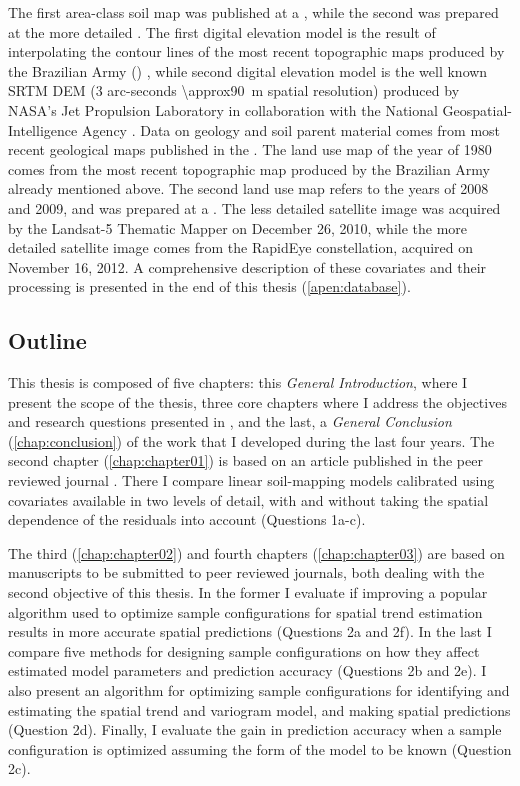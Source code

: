 The first area-class soil map was published at a  \cite{AzolinEtAl1988}, while the 
second was prepared at the more detailed  \cite{MiguelEtAl2012}. The first digital 
elevation model is the result of interpolating the contour lines of the most recent topographic maps
produced by the Brazilian Army () \cite{DSG1980,DSG1992,DSG1992a}, while second 
digital elevation model is the well known SRTM DEM (3 arc-seconds \SI{\approx90}{\metre} spatial 
resolution) produced by NASA’s Jet Propulsion Laboratory in collaboration with the National 
Geospatial-Intelligence Agency \cite{RodriguezEtAl2006}. Data on geology and soil parent material 
comes from most recent geological maps published in the  
\cite{MacielFilho1990,GasparettoEtAl1988}. The land use map of the year of 1980 comes from the most 
recent topographic 
map produced by the Brazilian Army already mentioned above. The second land use map refers to the 
years of 2008 and 2009, and was prepared at a  \cite{SamuelRosaEtAl2011a}. The less 
detailed satellite image was acquired by the Landsat-5 Thematic Mapper on December 26, 2010, while
the more detailed satellite image comes from the RapidEye constellation, acquired on November 16, 
2012. A comprehensive description of these covariates and their processing is presented in the 
end of this thesis (\autoref{apen:database}).

\subsection{Outline}
\label{sec:thesis-outline}

This thesis is composed of five chapters: this \emph{General Introduction}, where I present the scope 
of the thesis, three core chapters where I address the objectives and research questions presented
in , and the last, a \emph{General Conclusion} (\autoref{chap:conclusion})
of the work that I developed during the last four years. The second chapter (\autoref{chap:chapter01}) 
is based on an article published in the peer reviewed journal \geoderma. There I compare linear 
soil-mapping models calibrated using covariates available in two levels of detail, with and without 
taking the spatial dependence of the residuals into account (Questions 1a-c).

The third (\autoref{chap:chapter02}) and fourth chapters (\autoref{chap:chapter03}) are based on 
manuscripts to be submitted to peer reviewed journals, both dealing with the second objective of this
thesis. In the former I evaluate if improving a popular algorithm used to optimize sample configurations
for spatial trend estimation results in more accurate spatial predictions (Questions 2a and 2f). In the
last I compare five methods for designing sample configurations on how they affect estimated model 
parameters and prediction accuracy (Questions 2b and 2e). I also present an algorithm for optimizing 
sample configurations for identifying and estimating the spatial trend and variogram model, and making
spatial predictions (Question 2d). Finally, I evaluate the gain in prediction accuracy when a sample 
configuration is optimized assuming the form of the model to be known (Question 2c).

